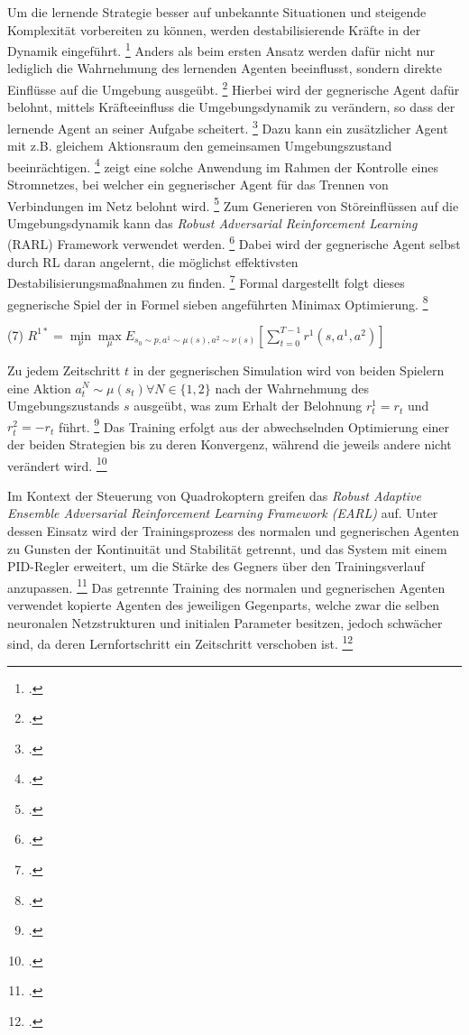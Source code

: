 Um die lernende Strategie besser auf unbekannte Situationen und steigende Komplexität vorbereiten zu können, werden destabilisierende Kräfte in der Dynamik eingeführt. \footcite[Vgl.][S. 1]{Pinto.2017}
Anders als beim ersten Ansatz werden dafür nicht nur lediglich die Wahrnehmung des lernenden Agenten beeinflusst, sondern direkte Einflüsse auf die Umgebung ausgeübt. \footcite[Vgl.][S. 2]{Schott.2022}
Hierbei wird der gegnerische Agent dafür belohnt, mittels Kräfteeinfluss die Umgebungsdynamik zu verändern, so dass der lernende Agent an seiner Aufgabe scheitert. \footcite[Vgl.][S. 2]{Pinto.2017}
Dazu kann ein zusätzlicher Agent mit z.B. gleichem Aktionsraum den gemeinsamen Umgebungszustand beeinrächtigen. \footcite[Vgl.][S. 2]{Pinto.2017}
\cite[]{Pan.2021} zeigt eine solche Anwendung im Rahmen der Kontrolle eines Stromnetzes, bei welcher ein gegnerischer Agent für das Trennen von Verbindungen im Netz belohnt wird. \footcite[Vgl.][S. 2]{Pan.2021}
Zum Generieren von Störeinflüssen auf die Umgebungsdynamik kann das \textit{Robust Adversarial Reinforcement Learning} (RARL) Framework verwendet werden. \footcite[Vgl.][S. 2]{Schott.2022}
Dabei wird der gegnerische Agent selbst durch RL daran angelernt, die möglichst effektivsten Destabilisierungsmaßnahmen zu finden. \footcite[Vgl.][S. 1]{Pinto.2017}
Formal dargestellt folgt dieses gegnerische Spiel der in Formel sieben angeführten Minimax Optimierung. \footcite[Vgl.][S. 3]{Pinto.2017}
\begin{description}
    \item \begin{center} (7) $R^{1*} = \underset{\nu}{\min}\underset{\mu}{\max} E_{s_{0}\sim p,a^{1}\sim\mu(s),a^{2}\sim\nu(s)} [\sum_{t=0}^{T-1} r^{1} (s,a^{1},a^{2})]$ \end{center} 
\end{description}
Zu jedem Zeitschritt $t$ in der gegnerischen Simulation wird von beiden Spielern eine Aktion $a_{t}^{N} \sim \mu(s_{t}) \forall N \in \{1,2\}$ nach der Wahrnehmung des Umgebungszustands $s$ ausgeübt, was zum Erhalt der Belohnung $r_{t}^{1} = r_{t}$ und $r_{t}^{2} = -r_{t}$ führt. \footcite[Vgl.][S. 3f.]{Pinto.2017}
Das Training erfolgt aus der abwechselnden Optimierung einer der beiden Strategien bis zu deren Konvergenz, während die jeweils andere nicht verändert wird. \footcite[Vgl.][S. 4]{Pinto.2017}

Im Kontext der Steuerung von Quadrokoptern greifen \cite[]{Zhai.2022} das \textit{Robust Adaptive Ensemble Adversarial Reinforcement Learning Framework (EARL)} auf.
Unter dessen Einsatz wird der Trainingsprozess des normalen und gegnerischen Agenten zu Gunsten der Kontinuität und Stabilität getrennt, und das System mit einem PID-Regler erweitert, um die Stärke des Gegners über den Trainingsverlauf anzupassen. \footcite[Vgl.][S. 2]{Zhai.2022}
Das getrennte Training des normalen und gegnerischen Agenten verwendet kopierte Agenten des jeweiligen Gegenparts, welche zwar die selben neuronalen Netzstrukturen und initialen Parameter besitzen, jedoch schwächer sind, da deren Lernfortschritt ein Zeitschritt verschoben ist. \footcite[Vgl.][S. 2f.]{Zhai.2022}

